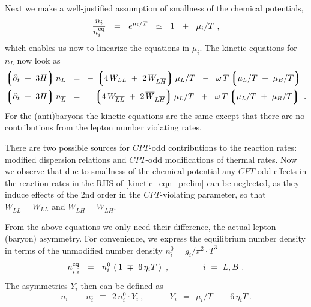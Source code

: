 \documentclass[12pt]{revtex4}
\newcommand{\eq}{{\rm eq}}
\newcommand{\lgr}{\left\lgroup}
\newcommand{\rgr}{\right\rgroup}
\newcommand{\p}{\partial}
\newcommand{\ov}{\overline}
\begin{document}
	Next we make a well-justified assumption of 
	smallness of the chemical potentials,
\[
	\frac{n_i}{n_i^\eq} ~~=~~ e^{\mu_i/T} ~~\simeq~~ 1 ~~+~~ \mu_i/T~,
\]
	which enables us now to linearize the equations in $ \mu_i $.	
	The kinetic equations for $ n_L $ now look as
\begin{equation}
\label{kinetic_eqn_prelim}
\begin{split}
	\lgr \p_t ~+~ 3H \rgr
		n_L ~~=~~ & 
	-\, \lgr 4\, W_{LL} ~+~ 2\, W_{L\ov{H}} \rgr  \mu_L/T 
	~~-~~
	\omega\, T \lgr \mu_L/T ~+~ \mu_B/T \rgr 
	\\
	\lgr \p_t ~+~ 3H \rgr
		n_{\ov{L}} ~~=~~ &
	\phantom{-\,}
	\lgr 4\, W_{\ov{LL}} ~+~ 2\, \ov{W}_{L\ov{H}} \rgr  \mu_L/T 
	~~+~~
	\omega\, T \lgr \mu_L/T ~+~ \mu_B/T \rgr ~.
\end{split}
\end{equation}
	For the (anti)baryons the kinetic equations are the same except
	that there are no contributions from the lepton number violating
	rates. 

	There are two possible sources for $CPT$-odd contributions 
	to the reaction rates: modified dispersion relations and 
	$CPT$-odd modifications of thermal rates. Now we observe that due to smallness of the chemical potential
	any $CPT$-odd effects in the reaction rates in the RHS of 
	\eqref{kinetic_eqn_prelim} can be neglected, as
	they induce effects of the 2nd order in the $CPT$-violating parameter, so that
	$ W_{\ov{LL}} = W_{LL} $ and
	$ \ov{W}_{L\ov{H}} = W_{L\ov{H}} $.

	From the above equations we only need their difference, the actual
	lepton (baryon) asymmetry.
	For convenience, we express the equilibrium number density in terms
	of the unmodified number density 
	$ n_i^0 = g_i/\pi^2 \cdot T^3 $
\[
	n_{i,\ov{i}}^\eq ~~=~~ n_i^0\, \left(\, 1 ~\mp~ 6\,\eta_i T \,\right)~,
	\qquad\qquad{i ~=~ L, B}~.
\]
	The asymmetries $ Y_i $ then can be defined as
\[
	n_i ~~-~~ n_{\ov{i}} ~~\equiv~~ 2\, n_i^0 \cdot Y_i~,
	\qquad\quad Y_i ~~=~~ \mu_i/T ~~-~~ 6\,\eta_i T~.
\]
	
\end{document}
